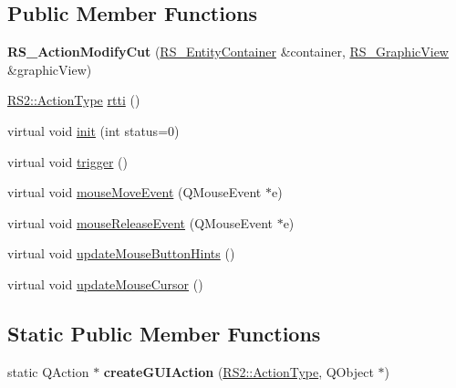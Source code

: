 \subsection*{Public Member Functions}
\begin{DoxyCompactItemize}
\item 
\hypertarget{classRS__ActionModifyCut_ae6a264e349569c09dc6bf7c1e8da8bf9}{{\bfseries R\-S\-\_\-\-Action\-Modify\-Cut} (\hyperlink{classRS__EntityContainer}{R\-S\-\_\-\-Entity\-Container} \&container, \hyperlink{classRS__GraphicView}{R\-S\-\_\-\-Graphic\-View} \&graphic\-View)}\label{classRS__ActionModifyCut_ae6a264e349569c09dc6bf7c1e8da8bf9}

\item 
\hyperlink{classRS2_afe3523e0bc41fd637b892321cfc4b9d7}{R\-S2\-::\-Action\-Type} \hyperlink{classRS__ActionModifyCut_a59e810bb29dee030c93f23c09acf8bbc}{rtti} ()
\item 
virtual void \hyperlink{classRS__ActionModifyCut_a1a2fc1692f802f8b147dc57d47ca6473}{init} (int status=0)
\item 
virtual void \hyperlink{classRS__ActionModifyCut_ada76b8e51948f468a5b9747043a4f345}{trigger} ()
\item 
virtual void \hyperlink{classRS__ActionModifyCut_a3bded418e2ceba0bfcdd19f54cf0b869}{mouse\-Move\-Event} (Q\-Mouse\-Event $\ast$e)
\item 
virtual void \hyperlink{classRS__ActionModifyCut_a1550d42d9ae7acd446c81381169d6ae9}{mouse\-Release\-Event} (Q\-Mouse\-Event $\ast$e)
\item 
virtual void \hyperlink{classRS__ActionModifyCut_aea8b2c39b56548e2ca0f47224609f488}{update\-Mouse\-Button\-Hints} ()
\item 
virtual void \hyperlink{classRS__ActionModifyCut_a25630f47756d474142742d9339cfcc79}{update\-Mouse\-Cursor} ()
\end{DoxyCompactItemize}
\subsection*{Static Public Member Functions}
\begin{DoxyCompactItemize}
\item 
\hypertarget{classRS__ActionModifyCut_aa2df65fc5aabfb24c30f04006c05cd4b}{static Q\-Action $\ast$ {\bfseries create\-G\-U\-I\-Action} (\hyperlink{classRS2_afe3523e0bc41fd637b892321cfc4b9d7}{R\-S2\-::\-Action\-Type}, Q\-Object $\ast$)}\label{classRS__ActionModifyCut_aa2df65fc5aabfb24c30f04006c05cd4b}

\end{DoxyCompactItemize}
